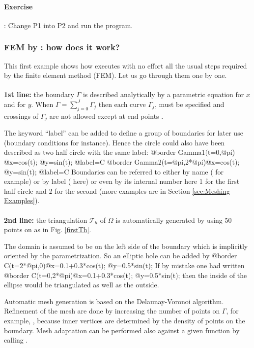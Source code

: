 \documentclass[a4paper,twoside,12pt]{book}
\def\refSec#1{Section \ref{sec:#1}}
\begin{document}
\paragraph{Exercise}:
Change P1 into P2 and run the program.


\subsubsection{FEM by \freefempp: how does it work?}
This first example shows how \freefempp executes  with no effort all
the usual steps required by the finite element method (FEM). Let us
go through them one by one.
\\\\
\textbf{1st line:} the boundary $\Gamma$ is described analytically
by a parametric equation for $x$ and for $y$. When
$\Gamma=\sum_{j=0}^J \Gamma_j$ then each curve $\Gamma_j$, must be
specified and crossings of $\Gamma_j$ are not allowed except at end
points .

The keyword ``label'' can be added to define a group
of boundaries for later use (boundary conditions for instance).
 Hence the circle could also have been described as two half circle with
 the same label:
 \bFF
@border Gamma1(t=0,@pi)   {@x=cos(t); @y=sin(t); @label=C}
@border Gamma2(t=@pi,2*@pi){@x=cos(t); @y=sin(t); @label=C}
 \eFF
Boundaries can be referred to  either by name ( for example) or by label ( here)
or even by its internal number here 1 for the first half circle and 2 for the second
(more examples are in \refSec{Meshing Examples}).
\\\\
\textbf{2nd line:} the triangulation $\mathcal{T}_h$ of $\Omega$ is
automatically generated  by  using $50$
points on  as in Fig. \ref{firstTh}.

The domain is assumed to be on the left side of the boundary which is implicitly
oriented by the parametrization. So an elliptic hole can be added by
 \bFF
 @border C(t=2*@pi,0){@x=0.1+0.3*cos(t); @y=0.5*sin(t);}
 \eFF
If by mistake one had written
 \bFF
 @border C(t=0,2*@pi){@x=0.1+0.3*cos(t); @y=0.5*sin(t);}
 \eFF
then the inside of the ellipse would be triangulated as well as the outside.

Automatic mesh generation is
based on the Delaunay-Voronoi algorithm. Refinement of the mesh are
done by increasing the number of points on $\Gamma$, for example,
, because inner vertices are determined
by the density of points on the boundary. Mesh adaptation can be performed also
against a given function  by calling .
\end{document}
